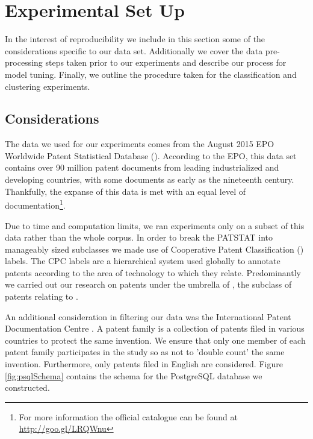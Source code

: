 
\chapter{Experimental Set Up} %

\label{Chapter3} %
In the interest of reproducibility we include in this section some of the considerations specific to our data set. Additionally we cover the data pre-processing steps taken prior to our experiments and describe our process for model tuning. Finally, we outline the procedure taken for the classification and clustering experiments. 

\section{Considerations}

The data we used for our experiments comes from the August 2015 EPO Worldwide Patent Statistical Database (). According to the EPO, this data set contains over 90 million patent documents from leading industrialized and developing countries, with some documents as early as the nineteenth century. Thankfully, the expanse of this data is met with an equal level of documentation\footnote{For more information the official catalogue can be found at \url{http://goo.gl/LRQWnu}}. 


Due to time and computation limits, we ran experiments only on a subset of this data rather than the whole corpus. In order to break the PATSTAT into manageably sized subclasses we made use of Cooperative Patent Classification () labels. The CPC labels are a hierarchical system used globally to annotate patents according to the area of technology to which they relate. Predominantly we carried out our research on patents under the umbrella of , the subclass of patents relating to .


An additional consideration in filtering our data was the International Patent Documentation Centre . A patent family is a collection of patents filed in various countries to protect the same invention. We ensure that only one member of each patent family participates in the study so as not to 'double count' the same invention. Furthermore, only patents filed in English are considered. Figure \ref{fig:psqlSchema} contains the schema for the PostgreSQL database we constructed. 



